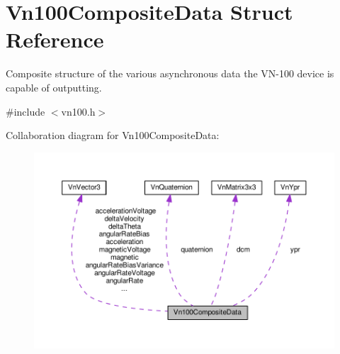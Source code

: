 \hypertarget{structVn100CompositeData}{}\section{Vn100\+Composite\+Data Struct Reference}
\label{structVn100CompositeData}


Composite structure of the various asynchronous data the V\+N-\/100 device is capable of outputting.  




{\ttfamily \#include $<$vn100.\+h$>$}



Collaboration diagram for Vn100\+Composite\+Data\+:\nopagebreak
\begin{figure}[H]
\begin{center}
\leavevmode
\includegraphics[width=350pt]{structVn100CompositeData__coll__graph}
\end{center}
\end{figure}
